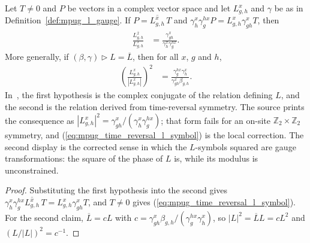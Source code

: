 \begin{lemma}
    \label{thm:mpug_time_reversal_l_symbol_relation}
    \leanok
    Let $T\neq0$ and $P$ be vectors in a complex vector space and let
    $L^x_{g,h}$ and $\gamma$ be as in Definition~\ref{def:mpug_l_gauge}.
    If $P=\overline{L^x_{g,h}}\,T$ and
    $\gamma^x_h\gamma^{h x}_gP=L^x_{g,h}\gamma^x_{gh}T$, then
    \begin{align}
        \frac{\overline{L^x_{g,h}}}{L^x_{g,h}}
         & =\frac{\gamma^x_{gh}}{\gamma^x_h\gamma^{h x}_g}.
        \label{eq:mpug_time_reversal_l_symbol}
    \end{align}
    More generally, if $(\beta,\gamma)\mathbin{\triangleright}L=\overline L$,
    then for all $x$, $g$ and $h$,
    \begin{align}
        \left(\frac{L^x_{g,h}}{|L^x_{g,h}|}\right)^2
         & =\frac{\gamma^{h x}_g\gamma^x_h}{\gamma^x_{gh}\beta_{g,h}}.
    \end{align}
    In~\cite[Section~4.3]{GarreRubio2023MPOSym}, the first hypothesis is
    the complex conjugate of the relation defining $L$, and the second is
    the relation derived from time-reversal symmetry. The source prints the consequence as
    $|L^x_{g,h}|^2=\gamma^x_{gh}/(\gamma^x_h\gamma^{h x}_g)$; that form fails
    for an on-site $\mathbb Z_2\times\mathbb Z_2$ symmetry, and
    (\ref{eq:mpug_time_reversal_l_symbol}) is the local correction. The second display is the
    corrected sense in which the $L$-symbols squared are gauge
    transformations: the square of the phase of $L$ is, while its modulus is
    unconstrained.
\end{lemma}
\begin{proof}\leanok
    Substituting the first hypothesis into the second gives
    $\gamma^x_h\gamma^{h x}_g\overline{L^x_{g,h}}\,T
        =L^x_{g,h}\gamma^x_{gh}T$, and $T\neq0$ gives
    (\ref{eq:mpug_time_reversal_l_symbol}). For the second claim,
    $\overline L=cL$ with
    $c=\gamma^x_{gh}\beta_{g,h}/(\gamma^{h x}_g\gamma^x_h)$, so
    $|L|^2=\overline LL=cL^2$ and $(L/|L|)^2=c^{-1}$.
\end{proof}

